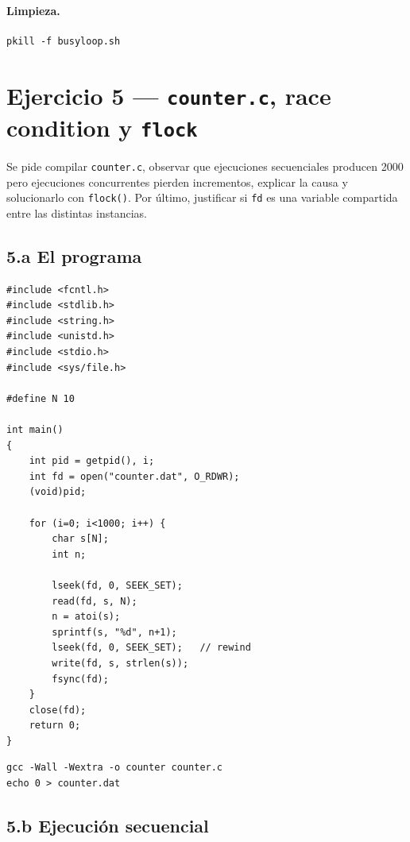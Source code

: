 \documentclass[11pt,a4paper]{article}
\begin{document}
\paragraph{Limpieza.}

\begin{lstlisting}
pkill -f busyloop.sh
\end{lstlisting}

\section{Ejercicio 5 --- \texttt{counter.c}, race condition y \texttt{flock}}

Se pide compilar \texttt{counter.c}, observar que ejecuciones secuenciales
producen 2000 pero ejecuciones concurrentes pierden incrementos, explicar
la causa y solucionarlo con \texttt{flock()}. Por último, justificar si
\texttt{fd} es una variable compartida entre las distintas instancias.

\subsection*{5.a El programa}

\begin{lstlisting}[style=cstyle]
#include <fcntl.h>
#include <stdlib.h>
#include <string.h>
#include <unistd.h>
#include <stdio.h>
#include <sys/file.h>

#define N 10

int main()
{
    int pid = getpid(), i;
    int fd = open("counter.dat", O_RDWR);
    (void)pid;

    for (i=0; i<1000; i++) {
        char s[N];
        int n;

        lseek(fd, 0, SEEK_SET);
        read(fd, s, N);
        n = atoi(s);
        sprintf(s, "%d", n+1);
        lseek(fd, 0, SEEK_SET);   // rewind
        write(fd, s, strlen(s));
        fsync(fd);
    }
    close(fd);
    return 0;
}
\end{lstlisting}

\begin{lstlisting}
gcc -Wall -Wextra -o counter counter.c
echo 0 > counter.dat
\end{lstlisting}

\subsection*{5.b Ejecución secuencial}
\end{document}
